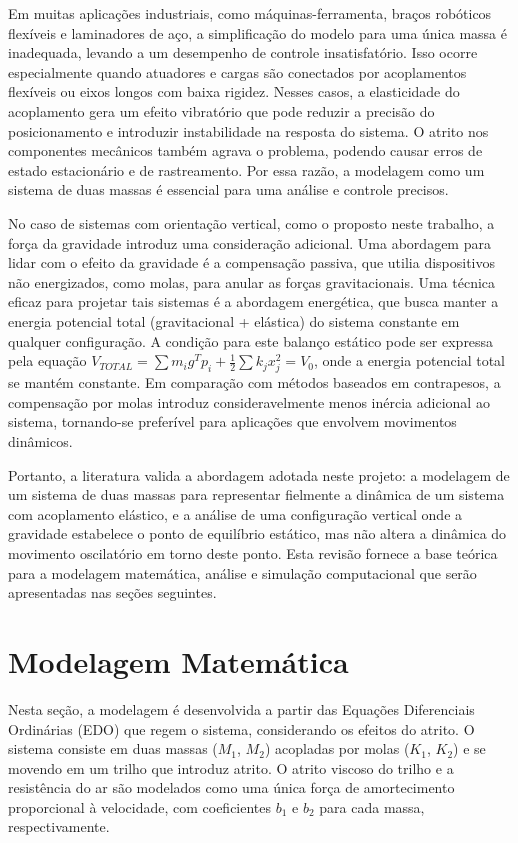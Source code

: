 \documentclass[9pt,a4paper,twocolumn,twoside]{tau-class/tau}
\begin{document}
Em muitas aplicações industriais, como máquinas-ferramenta, braços robóticos flexíveis e laminadores de aço, a simplificação do modelo para uma única massa é inadequada, levando a um desempenho de controle insatisfatório. Isso ocorre especialmente quando atuadores e cargas são conectados por acoplamentos flexíveis ou eixos longos com baixa rigidez. Nesses casos, a elasticidade do acoplamento gera um efeito vibratório que pode reduzir a precisão do posicionamento e introduzir instabilidade na resposta do sistema. O atrito nos componentes mecânicos também agrava o problema, podendo causar erros de estado estacionário e de rastreamento. Por essa razão, a modelagem como um sistema de duas massas é essencial para uma análise e controle precisos. \cite{ComparativeStudy}

No caso de sistemas com orientação vertical, como o proposto neste trabalho, a força da gravidade introduz uma consideração adicional. Uma abordagem para lidar com o efeito da gravidade é a compensação passiva, que utilia dispositivos não energizados, como molas, para anular as forças gravitacionais. Uma técnica eficaz para projetar tais sistemas é a abordagem energética, que busca manter a energia potencial total (gravitacional + elástica) do sistema constante em qualquer configuração. A condição para este balanço estático pode ser expressa pela equação $V_{TOTAL} = \sum m_i g^T p_i + \frac{1}{2} \sum k_j x^2_j = V_0$, onde a energia potencial total se mantém constante. Em comparação com métodos baseados em contrapesos, a compensação por molas introduz consideravelmente menos inércia adicional ao sistema, tornando-se preferível para aplicações que envolvem movimentos dinâmicos. \cite{PassiveGravity}

Portanto, a literatura valida a abordagem adotada neste projeto: a modelagem de um sistema de duas massas para representar fielmente a dinâmica de um sistema com acoplamento elástico, e a análise de uma configuração vertical onde a gravidade estabelece o ponto de equilíbrio estático, mas não altera a dinâmica do movimento oscilatório em torno deste ponto. Esta revisão fornece a base teórica para a modelagem matemática, análise e simulação computacional que serão apresentadas nas seções seguintes.

\section{Modelagem Matemática}

Nesta seção, a modelagem é desenvolvida a partir das Equações Diferenciais Ordinárias (EDO) que regem o sistema, considerando os efeitos do atrito. O sistema consiste em duas massas ($M_1$, $M_2$) acopladas por molas ($K_1$, $K_2$) e se movendo em um trilho que introduz atrito. O atrito viscoso do trilho e a resistência do ar são modelados como uma única força de amortecimento proporcional à velocidade, com coeficientes $b_1$ e $b_2$ para cada massa, respectivamente.
\end{document}

